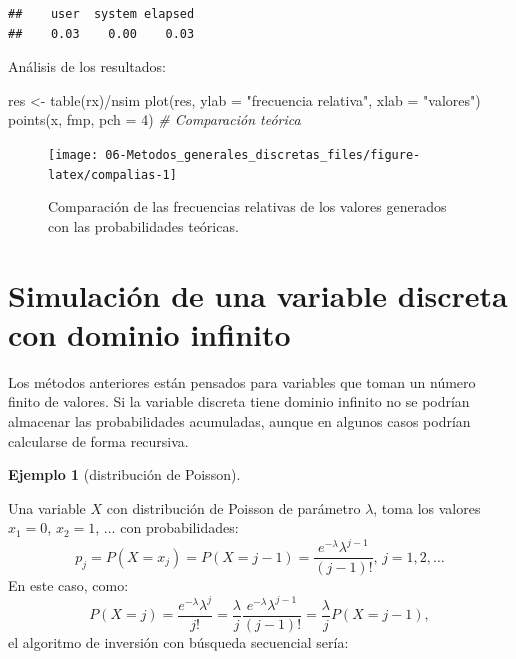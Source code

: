 \documentclass[
]{book}
\newenvironment{Shaded}{\begin{snugshade}}{\end{snugshade}}
\newcommand{\AttributeTok}[1]{\textcolor[rgb]{0.77,0.63,0.00}{#1}}
\newcommand{\CommentTok}[1]{\textcolor[rgb]{0.56,0.35,0.01}{\textit{#1}}}
\newcommand{\DecValTok}[1]{\textcolor[rgb]{0.00,0.00,0.81}{#1}}
\newcommand{\FunctionTok}[1]{\textcolor[rgb]{0.00,0.00,0.00}{#1}}
\newcommand{\NormalTok}[1]{#1}
\newcommand{\OtherTok}[1]{\textcolor[rgb]{0.56,0.35,0.01}{#1}}
\newcommand{\SpecialCharTok}[1]{\textcolor[rgb]{0.00,0.00,0.00}{#1}}
\newcommand{\StringTok}[1]{\textcolor[rgb]{0.31,0.60,0.02}{#1}}
\theoremstyle{break}
\theoremstyle{definition}
\theoremstyle{definition}
\newtheorem{example}{Ejemplo}[chapter]
\theoremstyle{definition}
\theoremstyle{definition}
\theoremstyle{remark}
\begin{document}
\begin{verbatim}
##    user  system elapsed 
##    0.03    0.00    0.03
\end{verbatim}

Análisis de los resultados:

\begin{Shaded}
\begin{Highlighting}[]
\NormalTok{res }\OtherTok{\textless{}{-}} \FunctionTok{table}\NormalTok{(rx)}\SpecialCharTok{/}\NormalTok{nsim}
\FunctionTok{plot}\NormalTok{(res, }\AttributeTok{ylab =} \StringTok{"frecuencia relativa"}\NormalTok{, }\AttributeTok{xlab =} \StringTok{"valores"}\NormalTok{)}
\FunctionTok{points}\NormalTok{(x, fmp, }\AttributeTok{pch =} \DecValTok{4}\NormalTok{)  }\CommentTok{\# Comparación teórica}
\end{Highlighting}
\end{Shaded}

\begin{figure}[!htb]

{\centering \texttt{[image: 06-Metodos\_generales\_discretas\_files/figure-latex/compalias-1]} 

}

\caption{Comparación de las frecuencias relativas de los valores generados con las probabilidades teóricas.}\label{fig:compalias}
\end{figure}

\hypertarget{simulaciuxf3n-de-una-variable-discreta-con-dominio-infinito}{%
\section{Simulación de una variable discreta con dominio infinito}\label{simulaciuxf3n-de-una-variable-discreta-con-dominio-infinito}}

Los métodos anteriores están pensados para variables que toman
un número finito de valores.
Si la variable discreta tiene dominio infinito no se podrían
almacenar las probabilidades acumuladas, aunque en algunos casos podrían
calcularse de forma recursiva.

\begin{example}[distribución de Poisson]
\protect\hypertarget{exm:unnamed-chunk-22}{}{\label{exm:unnamed-chunk-22} {} }
\end{example}
Una variable \(X\) con distribución de Poisson de parámetro \(\lambda\),
toma los valores \(x_{1}=0\), \(x_{2}=1\), \(\ldots\) con probabilidades:
\[p_{j}=P\left( X=x_{j}\right)  =P\left( X=j-1\right)  =\frac{e^{-\lambda
}\lambda^{j-1}}{\left( j-1\right)  !}\text{, }j=1,2,\ldots\]
En este caso, como:
\[P\left( X=j\right)  =\frac{e^{-\lambda}\lambda^{j}}{j!}
=\frac{\lambda}{j}\frac{e^{-\lambda}\lambda^{j-1}}{\left( j-1\right)  !}
=\frac{\lambda}{j}P\left( X=j-1\right),\]
el algoritmo de inversión con búsqueda secuencial sería:
\end{document}
